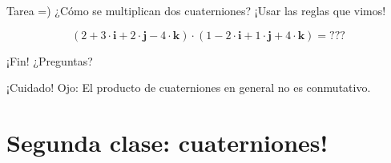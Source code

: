 \documentclass[10pt]{beamer}
\def\R{\mathbb{R}}
\def\ii{\textbf{i}}
\def\jj{\textbf{j}}
\def\kk{\textbf{k}}
\begin{document}
\begin{frame}{Tarea =)}
	¿Cómo se multiplican dos cuaterniones? ¡Usar las reglas que vimos! \bigskip
	
	$$(2+3\cdot \ii + 2 \cdot \jj - 4 \cdot \kk) \cdot (1-2\cdot \ii + 1 \cdot \jj + 4 \cdot \kk) = \text{???}$$
	
	
\end{frame}

\begin{frame}{¡Fin!}
\Huge ¿Preguntas?
\end{frame}



\begin{frame}{¡Cuidado!}
Ojo: El producto de cuaterniones en general no es conmutativo.


	
	
	
	
\end{frame}








\section{Segunda clase: cuaterniones!}
\end{document}
